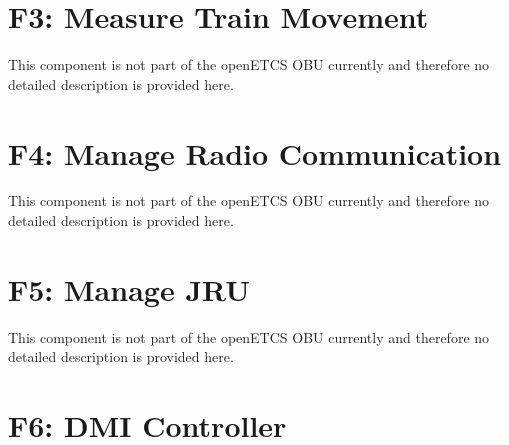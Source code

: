 \documentclass[oneside]{template/openetcs_report}
\begin{document}












\chapter{F3: Measure Train Movement}
This component is not part of the openETCS OBU currently and therefore no detailed description is provided here.

\chapter{F4: Manage Radio Communication}
This component is not part of the openETCS OBU currently and therefore no detailed description is provided here.

\chapter{F5: Manage JRU}
This component is not part of the openETCS OBU currently and therefore no detailed description is provided here.

\chapter{F6: DMI Controller}







\end{document}
